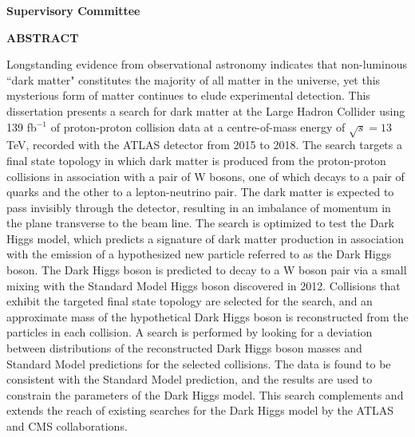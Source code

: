 \newpage
{}

\noindent \textbf{Supervisory Committee}
\tpbreak
\panel %

\newpage

\begin{center}
\textbf{ABSTRACT}
\end{center}

Longstanding evidence from observational astronomy indicates that non-luminous ``dark matter" constitutes the majority of all matter in the universe, yet this mysterious form of matter continues to elude experimental detection. This dissertation presents a search for dark matter at the Large Hadron Collider using 139 fb\(^{-1}\) of proton-proton collision data at a centre-of-mass energy of \(\sqrt{s} = 13\,\)TeV, recorded with the ATLAS detector from 2015 to 2018. The search targets a final state topology in which dark matter is produced from the proton-proton collisions in association with a pair of W bosons, one of which decays to a pair of quarks and the other to a lepton-neutrino pair. The dark matter is expected to pass invisibly through the detector, resulting in an imbalance of momentum in the plane transverse to the beam line. 
The search is optimized to test the Dark Higgs model, which predicts a signature of dark matter production in association with the emission of a hypothesized new particle referred to as the Dark Higgs boson. The Dark Higgs boson is predicted to decay to a W boson pair  via a small mixing with the Standard Model Higgs boson discovered in 2012. Collisions that exhibit the targeted final state topology are selected for the search, and an approximate mass of the hypothetical Dark Higgs boson is reconstructed from the particles in each collision. A search is performed by looking for a deviation between distributions of the reconstructed Dark Higgs boson masses and Standard Model predictions for the selected collisions. The data is found to be consistent with the Standard Model prediction, and the results are used to constrain the parameters of the Dark Higgs model. This search complements and extends the reach of existing searches for the Dark Higgs model by the ATLAS and CMS collaborations.




